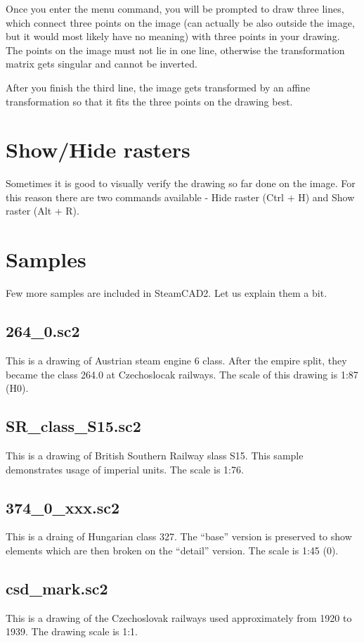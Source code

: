 Once you enter the menu command, you will be prompted to draw three lines, which connect
three points on the image (can actually be also outside the image, but it would most
likely have no meaning) with three points in your drawing. The points on the image
must not lie in one line, otherwise the transformation matrix gets singular and cannot
be inverted.

After you finish the third line, the image gets transformed by an affine transformation
so that it fits the three points on the drawing best.

\section{Show/Hide rasters}\label{sec:showraster}

Sometimes it is good to visually verify the drawing so far done on the image. For this
reason there are two commands available - Hide raster (Ctrl + H) and Show raster (Alt + R).

\section{Samples}\label{sec:samples}

Few more samples are included in SteamCAD2. Let us explain them a bit.

\subsection{264\_0.sc2}
This is a drawing of Austrian steam engine 6 class. After the empire split, they became
the class 264.0 at Czechoslocak railways. The scale of this drawing is 1:87 (H0).

\subsection{SR\_class\_S15.sc2}
This is a drawing of British Southern Railway slass S15. This sample demonstrates usage
of imperial units. The scale is 1:76.

\subsection{374\_0\_xxx.sc2}
This is a draing of Hungarian class 327. The ``base'' version is preserved to show elements
which are then broken on the ``detail'' version. The scale is 1:45 (0).

\subsection{csd\_mark.sc2}
This is a drawing of the Czechoslovak railways used approximately from 1920 to 1939. The
drawing scale is 1:1.

